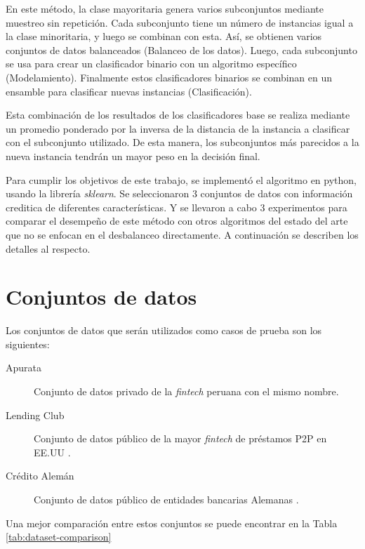 En este método, la clase mayoritaria genera varios subconjuntos mediante muestreo sin repetición. Cada subconjunto tiene un número de instancias igual a la clase minoritaria, y luego se combinan con esta. Así, se obtienen varios conjuntos de datos balanceados (Balanceo de los datos). Luego, cada subconjunto se usa para crear un clasificador binario con un algoritmo específico (Modelamiento). Finalmente estos clasificadores binarios se combinan en un ensamble para clasificar nuevas instancias (Clasificación).

Esta combinación de los resultados de los clasificadores base se realiza mediante un promedio ponderado por la inversa de la distancia de la instancia a clasificar con el subconjunto utilizado. De esta manera, los subconjuntos más parecidos a la nueva instancia tendrán un mayor peso en la decisión final.

Para cumplir los objetivos de este trabajo, se implementó el algoritmo en python, usando la librería \textit{sklearn}. Se seleccionaron 3 conjuntos de datos con información creditica de diferentes características. Y se llevaron a cabo 3 experimentos para comparar el desempeño de este método con otros algoritmos del estado del arte que no se enfocan en el desbalanceo directamente. A continuación se describen los detalles al respecto.


\section{Conjuntos de datos}

Los conjuntos de datos que serán utilizados como casos de prueba son los siguientes:

\begin{description}
    \item[Apurata] Conjunto de datos privado de la \textit{fintech} peruana con el mismo nombre.
    \item[Lending Club] Conjunto de datos público de la mayor \textit{fintech} de préstamos \ac{P2P} en EE.UU \citep{dataset:lending-club}.
    \item[Crédito Alemán] Conjunto de datos público de entidades bancarias Alemanas \citep{dataset:german-credit}.
\end{description}

Una mejor comparación entre estos conjuntos se puede encontrar en la Tabla \ref{tab:dataset-comparison}

